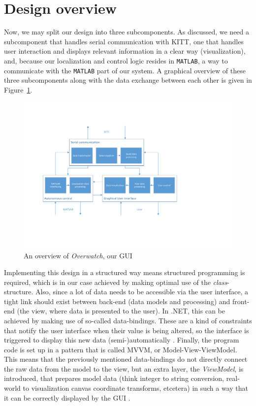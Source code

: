 \documentclass[11pt,titlepage]{report}
\begin{document}
\section{Design overview}
Now, we may split our design into three subcomponents. As discussed, we need a subcomponent that handles serial communication with KITT, one that handles user interaction and displays relevant information in a clear way (visualization), and, because our localization and control logic resides in \texttt{MATLAB}, a way to communicate with the \texttt{MATLAB} part of our system.
A graphical overview of these three subcomponents along with the data exchange between each other is given in Figure~\ref{fig:overwatch-overview}.

\begin{figure}[H]
	\centering
	\includegraphics[width=\linewidth]{resource/overwatch-overview.pdf}
	\caption{An overview of \emph{Overwatch}, our GUI}
	\label{fig:overwatch-overview}
\end{figure}

Implementing this design in a structured way means structured programming is required, which is in our case achieved by making optimal use of the \emph{class}-structure. Also, since a lot of data needs to be accessible via the user interface, a tight link should exist between back-end (data models and processing) and front-end (the view, where data is presented to the user). In .NET, this can be achieved by making use of so-called data-bindings. These are a kind of constraints that notify the user interface when their value is being altered, so the interface is triggered to display this new data (semi-)automatically \cite{data-binding}.
Finally, the program code is set up in a pattern that is called MVVM, or Model-View-ViewModel. This means that the previously mentioned data-bindings do not directly connect the raw data from the model to the view, but an extra layer, the \emph{ViewModel}, is introduced, that prepares model data (think integer to string conversion, real-world to visualization canvas coordinate transforms, etcetera) in such a way that it can be correctly displayed by the GUI \cite{mvvm}.
\end{document}

